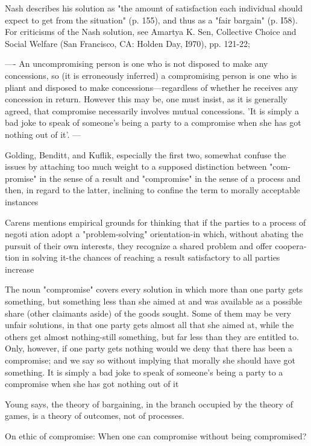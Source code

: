 Nash describes his solution as "the amount of satisfaction each individual should expect to get from the situation" (p. 155), and thus as a
"fair bargain" (p. I58).
For criticisms of the Nash solution, see Amartya K. Sen, Collective Choice and Social
Welfare (San Francisco, CA: Holden Day, I970), pp. 121-22;

----
\cite{Day1989}
An uncompromising person is one who is not disposed to make any concessions, so (it is erroneously inferred) a compromising person is one who is pliant and disposed to make concessions—regardless of whether he receives any concession in return. However this may be, one must insist, as it is generally agreed, that compromise necessarily involves mutual concessions. 'It is simply a bad joke to speak of someone's being a party to a compromise when she has got nothing out of it'. \cite{Braybrooke1982}
---

\cite{Braybrooke1982}
Golding, Benditt, and Kuflik, especially the first two, somewhat confuse the
issues by attaching too much weight to a supposed distinction between "com-
promise" in the sense of a result and "compromise" in the sense of a process and
then, in regard to the latter, inclining to confine the term to morally acceptable
instances

Carens mentions empirical grounds for thinking that if the parties to a process of negoti
ation adopt a "problem-solving" orientation-in which, without abating the
pursuit of their own interests, they recognize a shared problem and offer coopera-
 tion in solving it-the chances of reaching a result satisfactory to all parties
increase

 The noun "compromise" covers every solution in which more than one party
gets something, but something less than she aimed at and was available as a
possible share (other claimants aside) of the goods sought. Some of them may be
very unfair solutions, in that one party gets almost all that she aimed at, while the
others get almost nothing-still something, but far less than they are entitled to.
Only, however, if one party gets nothing would we deny that there has been a
compromise; and we say so without implying that morally she should have got
something. It is simply a bad joke to speak of someone's being a party to a
compromise when she has got nothing out of it

Young says, the theory of bargaining, in the branch occupied by the theory of
games, is a theory of outcomes, not of processes.



On ethic of compromise: When one can compromise without being compromised?
